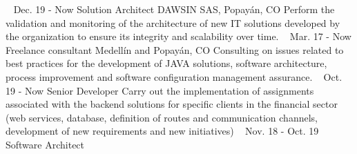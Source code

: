 \documentclass[american]{cv-class}
\begin{document}
\begin{entrylist}
	~ 
    \entry
	{Dec. 19 - Now}
	{Solution Architect}
	{DAWSIN SAS, Popayán, CO}
	{Perform the validation and monitoring of the architecture
	of new IT solutions developed by the organization to ensure its integrity and scalability over time.}
	~ 
    \entry
	{Mar. 17 - Now}
	{Freelance consultant}
	{Medellín and Popayán, CO}
	{Consulting on issues related to best practices for the development of JAVA solutions, software architecture, process improvement and software configuration management assurance.}
	~ 
    \entry
	{Oct. 19 - Now}
	{Senior Developer}
	{\href{https://tecso.coop/}{ }}
	{Carry out the implementation of assignments associated with the backend solutions for specific clients in the financial sector (web services, database, definition of routes and communication channels, development of new requirements and new initiatives)}
	~ 
    \entry
	{Nov. 18 - Oct. 19}
	{Software Architect}
	{\href{http://www.serviciosenweb.com/}{ }}

\end{entrylist}
\end{document}
